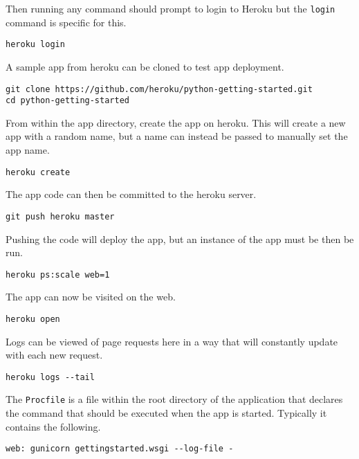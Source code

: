 \documentclass[]{book}
\begin{document}
Then running any command should prompt to login to Heroku but the
\texttt{login} command is specific for this.

\begin{verbatim}
heroku login
\end{verbatim}

A sample app from heroku can be cloned to test app deployment.

\begin{verbatim}
git clone https://github.com/heroku/python-getting-started.git
cd python-getting-started
\end{verbatim}

From within the app directory, create the app on heroku. This will
create a new app with a random name, but a name can instead be passed to
manually set the app name.

\begin{verbatim}
heroku create
\end{verbatim}

The app code can then be committed to the heroku server.

\begin{verbatim}
git push heroku master
\end{verbatim}

Pushing the code will deploy the app, but an instance of the app must be
then be run.

\begin{verbatim}
heroku ps:scale web=1
\end{verbatim}

The app can now be visited on the web.

\begin{verbatim}
heroku open
\end{verbatim}

Logs can be viewed of page requests here in a way that will constantly
update with each new request.

\begin{verbatim}
heroku logs --tail
\end{verbatim}

The \texttt{Procfile} is a file within the root directory of the
application that declares the command that should be executed when the
app is started. Typically it contains the following.

\begin{verbatim}
web: gunicorn gettingstarted.wsgi --log-file -
\end{verbatim}
\end{document}
